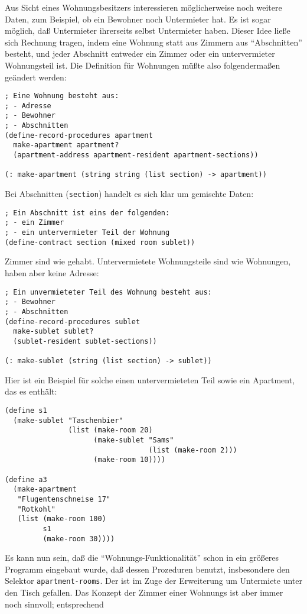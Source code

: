 Aus Sicht eines Wohnungsbesitzers interessieren möglicherweise noch
weitere Daten, zum Beispiel, ob ein Bewohner noch Untermieter hat.
Es ist sogar möglich, daß Untermieter ihrerseits selbst Untermieter
haben.  Dieser Idee ließe sich Rechnung tragen, indem eine Wohnung
statt aus Zimmern aus "`Abschnitten"' besteht, und jeder Abschnitt
entweder ein Zimmer oder ein untervermieter Wohnungsteil ist.  Die
Definition für Wohnungen müßte also folgendermaßen geändert werden:
%
\begin{verbatim}
; Eine Wohnung besteht aus:
; - Adresse
; - Bewohner
; - Abschnitten
(define-record-procedures apartment
  make-apartment apartment?
  (apartment-address apartment-resident apartment-sections))

(: make-apartment (string string (list section) -> apartment))
\end{verbatim}
%
Bei Abschnitten (\texttt{section}) handelt es sich klar um gemischte
Daten:
%
\begin{verbatim}
; Ein Abschnitt ist eins der folgenden:
; - ein Zimmer
; - ein untervermieter Teil der Wohnung
(define-contract section (mixed room sublet))
\end{verbatim}
%
Zimmer sind wie gehabt.   Untervermietete Wohnungsteile sind wie
Wohnungen, haben aber keine Adresse:
%
\begin{verbatim}
; Ein unvermieteter Teil des Wohnung besteht aus:
; - Bewohner
; - Abschnitten
(define-record-procedures sublet
  make-sublet sublet?
  (sublet-resident sublet-sections))

(: make-sublet (string (list section) -> sublet))
\end{verbatim}
%
Hier ist ein Beispiel für solche einen untervermieteten Teil sowie ein
Apartment, das es enthält:
%
\begin{verbatim}
(define s1
  (make-sublet "Taschenbier"
               (list (make-room 20) 
                     (make-sublet "Sams"
                                  (list (make-room 2)))
                     (make-room 10))))

(define a3
  (make-apartment
   "Flugentenschneise 17"
   "Rotkohl"
   (list (make-room 100)
         s1
         (make-room 30))))
\end{verbatim}
%
Es kann nun sein, daß die "`Wohnungs-Funktionalität"' schon in ein
größeres Programm eingebaut wurde, daß dessen Prozeduren benutzt,
insbesondere den Selektor \texttt{apartment-rooms}.  Der ist im Zuge
der Erweiterung um Untermiete unter den Tisch gefallen.  Das Konzept
der Zimmer einer Wohnungs ist aber immer noch sinnvoll; entsprechend
